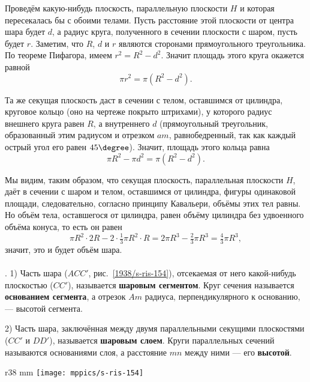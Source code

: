 Проведём какую-нибудь плоскость, параллельную плоскости $H$ и которая пересекалась бы с обоими телами.
Пусть расстояние этой плоскости от центра шара будет $d$, а радиус круга, полученного в сечении плоскости с шаром, пусть будет $r$.
Заметим, что $R$, $d$ и $r$ являются сторонами прямоугольного треугольника.
По теореме Пифагора, имеем $r^2=R^2-d^2$.
Значит площадь этого круга окажется равной 
\[\pi r^2 = \pi (R^2 - d^2).\]

Та же секущая плоскость даст в сечении с телом, оставшимся от цилиндра, круговое кольцо (оно на чертеже покрыто штрихами), у которого радиус внешнего круга равен $R$, а внутреннего $d$ (прямоугольный треугольник, образованный этим радиусом и отрезком $am$, равнобедренный, так как каждый острый угол его равен $45\degree$).
Значит, площадь этого кольца равна 
\[\pi R^2 - \pi d^2 = \pi(R^2 - d^2).\]

Мы видим, таким образом, что секущая плоскость, параллельная плоскости $H$, даёт в сечении с шаром и телом, оставшимся от цилиндра, фигуры одинаковой площади, следовательно, согласно принципу Кавальери, объёмы этих тел равны.
Но объём тела, оставшегося от цилиндра, равен объёму цилиндра без удвоенного объёма конуса, то есть он равен
\[\pi R^2\cdot 2R - 2 \cdot \tfrac13\pi R^2\cdot R = 2\pi R^3 - \tfrac23\pi R^3 = \tfrac43\pi R^3,\]
значит, это и будет объём шара.

\paragraph{}\label{1938/s148}
\mbox{.}
1) Часть шара ($ACC'$, рис.~\ref{1938/s-ris-154}), отсекаемая от него какой-нибудь плоскостью ($CC'$), называется \textbf{шаровым сегментом}.
Круг сечения называется \textbf{основанием сегмента}, а отрезок $Am$ радиуса, перпендикулярного к основанию, — высотой сегмента.

2) Часть шара, заключённая между двумя параллельными секущими плоскостями ($CC'$ и $DD'$), называется \textbf{шаровым слоем}.
Круги параллельных сечений называются основаниями слоя, а расстояние $mn$ между ними — его \textbf{высотой}.

\begin{wrapfigure}{r}{38 mm}
\vskip-0mm
\centering
\texttt{[image: mppics/s-ris-154]}
\caption{}\label{1938/s-ris-154}
\vskip-0mm
\end{wrapfigure}

